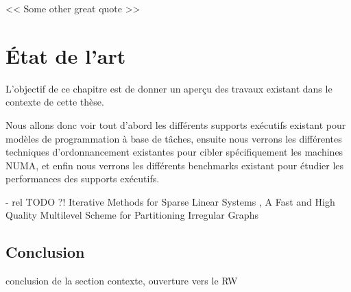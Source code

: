 
\begin{savequote}[6cm]
<< Some other great quote  >>
\end{savequote}
\chapter{État de l'art}\label{chap:rw}
\chaptertoc

L'objectif de ce chapitre est de donner un aperçu des travaux existant dans le contexte de cette thèse.

Nous allons donc voir tout d'abord les différents supports exécutifs existant pour modèles de programmation à base de tâches, ensuite nous verrons les différentes techniques d'ordonnancement existantes pour cibler spécifiquement les machines NUMA, et enfin nous verrons les différents benchmarks existant pour étudier les performances des supports exécutifs.






 - rel TODO ?!
\cite{Saad2013} Iterative Methods for Sparse Linear Systems
\cite{Karypis1998}, A Fast and High Quality Multilevel Scheme for Partitioning Irregular Graphs






\section*{Conclusion}
\begin{todo}
conclusion de la section contexte, ouverture vers le RW
\end{todo}
